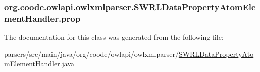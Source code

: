 \hypertarget{classorg_1_1coode_1_1owlapi_1_1owlxmlparser_1_1_s_w_r_l_data_property_atom_element_handler_abca3b0326e6e166d6f84c352bfdd4cf5}{
\subsubsection[{prop}]{ org.\-coode.\-owlapi.\-owlxmlparser.\-S\-W\-R\-L\-Data\-Property\-Atom\-Element\-Handler.\-prop\hspace{0.3cm}{\ttfamily [private]}}}\label{classorg_1_1coode_1_1owlapi_1_1owlxmlparser_1_1_s_w_r_l_data_property_atom_element_handler_abca3b0326e6e166d6f84c352bfdd4cf5}


The documentation for this class was generated from the following file\-:\begin{DoxyCompactItemize}
\item 
parsers/src/main/java/org/coode/owlapi/owlxmlparser/\hyperlink{_s_w_r_l_data_property_atom_element_handler_8java}{S\-W\-R\-L\-Data\-Property\-Atom\-Element\-Handler.\-java}\end{DoxyCompactItemize}
